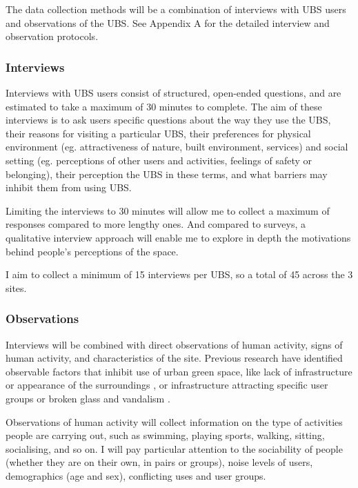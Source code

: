 \documentclass{article}
\begin{document}
The data collection methods will be a combination of interviews with UBS users and observations of the UBS. See Appendix A for the detailed interview and observation protocols.

\subsubsection{Interviews}

Interviews with UBS users consist of structured, open-ended questions, and are estimated to take a maximum of 30 minutes to complete. The aim of these interviews is to ask users specific questions about the way they use the UBS, their reasons for visiting a particular UBS, their preferences for physical environment (eg. attractiveness of nature, built environment, services) and  social setting (eg. perceptions of other users and activities, feelings of safety or belonging), their perception the UBS in these terms, and what barriers may inhibit them from using UBS.

Limiting the interviews to 30 minutes will allow me to collect a maximum of responses compared to more lengthy ones. And compared to surveys, a qualitative interview approach will enable me to explore in depth the motivations behind people's perceptions of the space.

I aim to collect a minimum of 15 interviews per UBS, so a total of 45 across the 3 sites.

\subsubsection{Observations}

Interviews will be combined with direct observations of human activity, signs of human activity, and characteristics of the site. Previous research have identified observable factors that inhibit use of urban green space, like lack of infrastructure or appearance of the surroundings \parencite{raymond2016integrating}, or infrastructure attracting specific user groups or broken glass and vandalism \parencite{noel2021social}.

Observations of human activity will collect information on the type of activities people are carrying out, such as swimming, playing sports, walking, sitting, socialising, and so on. I will pay particular attention to the sociability of people (whether they are on their own, in pairs or groups), noise levels of users, demographics (age and sex), conflicting uses and user groups.
\end{document}
